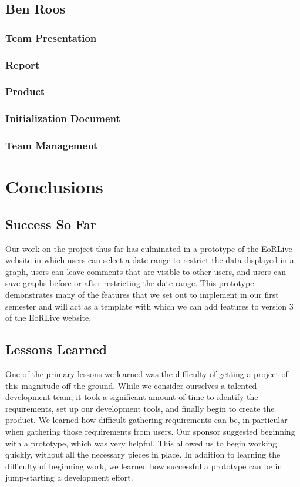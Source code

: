 \documentclass[12pt]{article}
\begin{document}
\begin{spacing}{1.5}
\clearpage

\subsection{Ben Roos}
\subsubsection{Team Presentation}
\subsubsection{Report}
\subsubsection{Product}
\subsubsection{Initialization Document}
\subsubsection{Team Management}

\clearpage

\section{Conclusions}
\subsection{Success So Far}
Our work on the project thus far has culminated in a prototype of the EoRLive website in which users can select a date range to restrict the data displayed in a graph, users can leave comments that are visible to other users, and users can save graphs before or after restricting the date range. This prototype demonstrates many of the features that we set out to implement in our first semester and will act as a template with which we can add features to version 3 of the EoRLive website.
\subsection{Lessons Learned}
One of the primary lessons we learned was the difficulty of getting a project of this magnitude off the ground. While we consider ourselves a talented development team, it took a significant amount of time to identify the requirements, set up our development tools, and finally begin to create the product. We learned how difficult gathering requirements can be, in particular when gathering those requirements from users. Our sponsor suggested beginning with a prototype, which was very helpful. This allowed us to begin working quickly, without all the necessary pieces in place. In addition to learning the difficulty of beginning work, we learned how successful a prototype can be in jump-starting a development effort.

\end{spacing}
\end{document}
